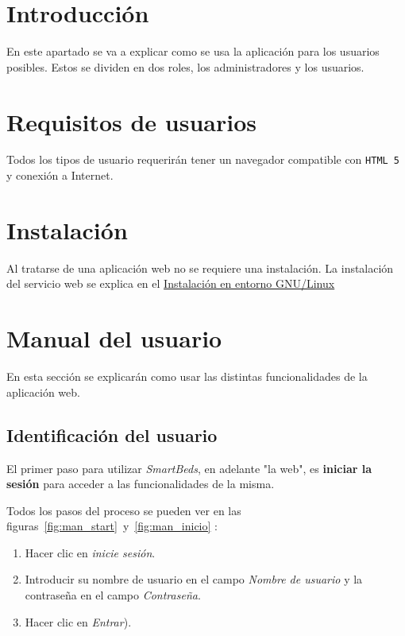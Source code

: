 
\section{Introducción}

En este apartado se va a explicar como se usa la aplicación para los usuarios posibles. Estos se dividen en dos roles, los administradores y los usuarios.

\section{Requisitos de usuarios}

Todos los tipos de usuario requerirán tener un navegador compatible con \texttt{HTML 5} y conexión a Internet.

\section{Instalación}

Al tratarse de una aplicación web no se requiere una instalación. La instalación del servicio web se explica en el \hyperref[sec:instalacion]{Instalación en entorno GNU/Linux}

\section{Manual del usuario}

En esta sección se explicarán como usar las distintas funcionalidades de la aplicación web.

\subsection{Identificación del usuario}

El primer paso para utilizar \textit{SmartBeds}, en adelante "la web", es \textbf{iniciar la sesión} para acceder a las funcionalidades de la misma. 

Todos los pasos del proceso se pueden ver en las figuras~\ref{fig:man_start}~y~\ref{fig:man_inicio} :
\begin{enumerate}
	\item Hacer clic en \textit{inicie sesión}.
	\item Introducir su nombre de usuario en el campo \textit{Nombre de usuario} y la contraseña en el campo \textit{Contraseña}.
	\item Hacer clic en \textit{Entrar}).
\end{enumerate} 

